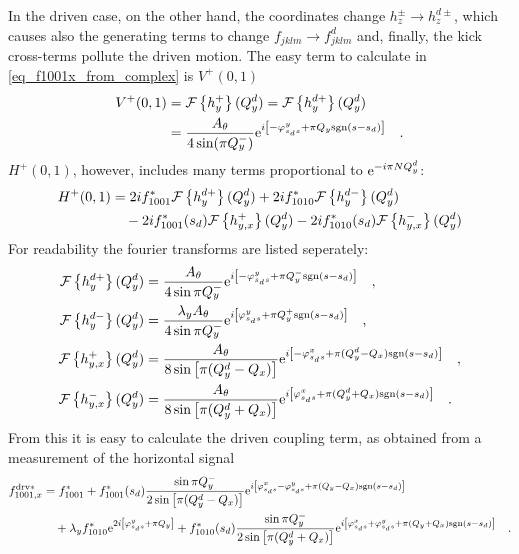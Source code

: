 %
In the driven case, on the other hand, the coordinates change $h_z^\pm \rightarrow h_z^{d\pm}$, which
causes also the generating terms to change $f_{jklm} \rightarrow f^d_{jklm}$ and, finally, the kick
cross-terms pollute the driven motion.
The easy term to calculate in \eqref{eq_f1001x_from_complex} is $V^+(0,1)$
%
\begin{align}
    V^+(0,1) &= \mathcal{F} \left\{ h_y^+ \right\}(Q_y^d) = \mathcal{F} \left\{ h_y^{d+} \right\}(Q_y^d)
    \notag \\
    &= \frac{A_\theta}{4\sin(\pi Q_y^-)}
        \text{e}^{i\left[-\varphi_{s_ds}^{y} + \pi Q_y\text{sgn}(s-s_d)\right]}
        \quad .
\end{align}
%
$H^+(0,1)$, however, includes many terms proportional to $\text{e}^{-i\pi N Q_y^d}$:
%
\begin{align}
   H^+(0,1) &=
    2i f_{1001}^*      \mathcal{F} \left\{ h_y^{d+} \right\}(Q_y^d)
   +2i f_{1010}^*      \mathcal{F} \left\{ h_y^{d-} \right\}(Q_y^d)
   \notag \\&\quad
   -2i f_{1001}^*(s_d) \mathcal{F} \left\{ h_{y,x}^{+} \right\}(Q_y^d)
   -2i f_{1010}^*(s_d) \mathcal{F} \left\{ h_{y,x}^{-} \right\}(Q_y^d)
\end{align}
%
For readability the fourier transforms are listed seperately:
%
\begin{align}
    \mathcal{F} \left\{ h_y^{d+} \right\}(Q_y^d) &= \frac{A_\theta}{4\sin\pi Q_y^-}
        \text{e}^{i\left[-\varphi_{s_ds}^{y} + \pi Q_y^-\text{sgn}(s-s_d)\right]}
    \quad ,
    \notag \\
    \mathcal{F} \left\{ h_y^{d-} \right\}(Q_y^d) &= \frac{\lambda_y A_\theta}{4\sin\pi Q_y^-}
        \text{e}^{i\left[\varphi_{s_ds}^{y} + \pi Q_y^+\text{sgn}(s-s_d)\right]}
    \quad ,
    \notag \\
    \mathcal{F} \left\{ h_{y,x}^{+} \right\}(Q_y^d) &= \frac{A_\theta}{8\sin\left[\pi (Q_y^d - Q_x)\right]}
        \text{e}^{i\left[-\varphi_{s_ds}^{x} + \pi (Q_y^d - Q_x)\text{sgn}(s-s_d)\right]}
    \quad ,
    \notag \\
    \mathcal{F} \left\{ h_{y,x}^{-} \right\}(Q_y^d) &= \frac{A_\theta}{8\sin\left[\pi (Q_y^d + Q_x)\right]}
        \text{e}^{i\left[\varphi_{s_ds}^{x} + \pi (Q_y^d + Q_x)\text{sgn}(s-s_d)\right]}
    \quad .
\end{align}
%
From this it is easy to calculate the driven coupling term, as obtained from a measurement of the horizontal signal
%
\begin{align}
    f_{1001,x}^{\text{drv}*} &=
    f_{1001}^*
    + f_{1001}^*(s_d) \frac{\sin\pi Q_y^-}{2\sin\left[\pi (Q_y^d-Q_x)\right]}
        \text{e}^{i\left[\varphi_{s_ds}^{x} -\varphi_{s_ds}^{y} + \pi(Q_y-Q_x)\text{sgn}(s-s_d)\right]}
        \notag \\
    &\quad
    + \lambda_y f_{1010}^*\text{e}^{2i\left[ \varphi_{s_ds}^{y} + \pi Q_y\right]}
    + f_{1010}^*(s_d) \frac{\sin\pi Q_y^-}{2\sin\left[\pi (Q_y^d+Q_x)\right]}
        \text{e}^{i\left[\varphi_{s_ds}^{x} + \varphi_{s_ds}^{y} + \pi(Q_y+Q_x)\text{sgn}(s-s_d)\right]}
        \quad .
    \label{eq_drv_f1001_final}
\end{align}
